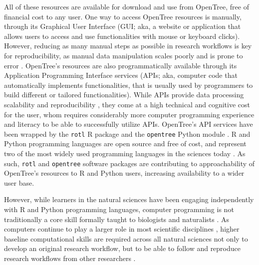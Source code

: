 \documentclass[12pt]{article}
\begin{document}
All of these resources
are available for download and use from OpenTree, free of financial cost to any user.
One way to access OpenTree resources is manually, through its Graphical User Interface (GUI; aka, a website or application that allows users to access and use functionalities with mouse or keyboard clicks).
However, reducing as many manual steps as possible in research workflows is key for reproducibility, as manual data manipulation scales poorly and is prone to error \citep{bakken2019journey}.
OpenTree's resources are also programmatically available through its Application Programming Interface services (APIs; aka, computer code that automatically implements functionalities, that is usually used by programmers to build different or tailored functionalities). While APIs provide data processing scalability and reproducibility \citep{opentreeAPIv3}, they come at a high technical and cognitive cost for the user, whom requires considerably more computer programming experience and literacy to be able to successfully utilize APIs.
OpenTree's API services have been wrapped by the \texttt{rotl} R package \citep{michonneau2016rotl} and the \texttt{opentree} Python module \citep{mctavish2021opentree}.
R and Python programming languages are open source and free of cost, and represent two of the most widely used programming languages in the sciences today \citep{eglen2009quick, baker2017scientific}.
As such, \texttt{rotl} and \texttt{opentree} software packages are contributing to approachability of OpenTree's resources to R and Python users, increasing availability to a wider user base.

However, while learners in the natural sciences have been engaging independently with R and Python programming languages, computer programming is not traditionally a core skill formally taught to biologists and naturalists \citep{sayres2018bioinformatics, wright2019the, williams2019barriers}.
As computers continue to play a larger role in most scientific disciplines \citep{piccolo2016tools}, higher baseline computational skills are required across all natural sciences not only to develop an original research workflow, but to be able to follow and reproduce research workflows from other researchers \citep{nasem2019reproducibility}.
\end{document}
